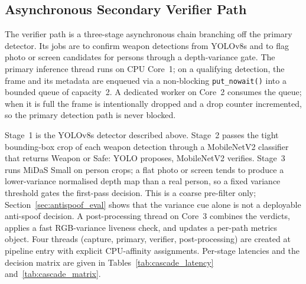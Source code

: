 \documentclass{ieeeaccess}
\begin{document}
\subsection{Asynchronous Secondary Verifier Path}
\label{sec:verifier_path}
The verifier path is a three-stage asynchronous chain branching off the primary detector. Its jobs are to confirm weapon detections from YOLOv8s and to flag photo or screen candidates for persons through a depth-variance gate. The primary inference thread runs on CPU Core~1; on a qualifying detection, the frame and its metadata are enqueued via a non-blocking \texttt{put\_nowait()} into a bounded queue of capacity~2. A dedicated worker on Core~2 consumes the queue; when it is full the frame is intentionally dropped and a drop counter incremented, so the primary detection path is never blocked.

Stage~1 is the YOLOv8s detector described above. Stage~2 passes the tight bounding-box crop of each weapon detection through a MobileNetV2 classifier that returns Weapon or Safe: YOLO proposes, MobileNetV2 verifies. Stage~3 runs MiDaS Small on person crops; a flat photo or screen tends to produce a lower-variance normalised depth map than a real person, so a fixed variance threshold gates the first-pass decision. This is a coarse pre-filter only; Section~\ref{sec:antispoof_eval} shows that the variance cue alone is not a deployable anti-spoof decision. A post-processing thread on Core~3 combines the verdicts, applies a fast RGB-variance liveness check, and updates a per-path metrics object. Four threads (capture, primary, verifier, post-processing) are created at pipeline entry with explicit CPU-affinity assignments. Per-stage latencies and the decision matrix are given in Tables~\ref{tab:cascade_latency} and~\ref{tab:cascade_matrix}.
\end{document}
